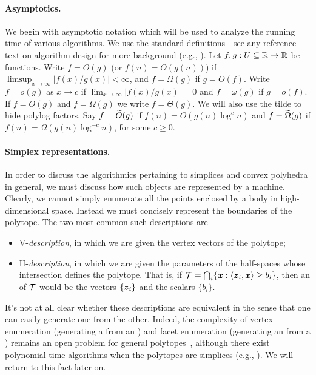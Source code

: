 \paragraph{Asymptotics.}
We begin with asymptotic notation which will be used to analyze the running time of various algorithms. We use the standard definitions---see any reference text on algorithm design for more background (e.g., \cite{kleinberg2006algorithm}). Let $f,g:U\subseteq \mathbb{R} \to \mathbb{R}$ be functions. Write $f=O(g)$ (or $f(n)=O(g(n))$) if $\limsup_{x\to \infty}|f(x)/g(x)|<\infty$, and $f=\Omega(g)$ if $g=O(f)$. Write $f=o(g)$ as $x\to c$ if $\lim_{x\to \infty}|f(x)/g(x)|=0$ and $f=\omega(g)$ if $g=o(f)$. If $f=O(g)$ and $f=\Omega(g)$ we write $f=\Theta(g)$. We will also use the tilde to hide polylog factors. Say $f=\widetilde{O}(g)$ if $f(n) = O(g(n) \log^c n)$ and $f=\widetilde{\Omega}(g)$ if $f(n) = \Omega(g(n) \log^{-c}n)$, for some $c\geq 0$. 


\paragraph{Simplex representations.}
In order to discuss the algorithmics pertaining to simplices and convex polyhedra in general, we must discuss how such objects are represented by a machine. Clearly, we cannot simply enumerate all the points enclosed by a body in high-dimensional space. Instead we must concisely represent the boundaries of the polytope. The two most common such descriptions are 
\begin{itemize}
	\item \textsf{V}-\emph{description}, in which we are given the vertex vectors of the polytope; 
	\item \textsf{H}-\emph{description}, in which we are given the parameters of the half-spaces whose intersection defines the polytope. That is, if $\mathcal{T}=\bigcap_i \{\vb*{x}:\langle \vb*{z}_i,\vb*{x}\rangle \geq b_i\}$, then an \hdesc of $\mathcal{T}$ would be the vectors $\{\vb*{z}_i\}$ and the scalars $\{b_i\}$. 
\end{itemize}

It's not at all clear whether these descriptions are equivalent in the sense that one can easily generate one from the other. Indeed, the complexity of vertex enumeration (generating a \vdesc from an \hdesc) and facet enumeration (generating an \hdesc from a \vdesc) remains an open problem for general polytopes~\cite{kaibel2003some}, although there exist polynomial time algorithms when the polytopes are simplices (e.g., \cite{bremner1998primal}). We will return to this fact later on. 

